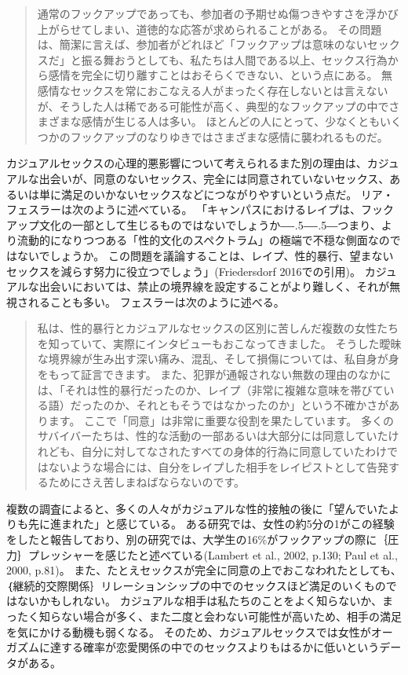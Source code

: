 \documentclass[paper=a4,book,openany]{jlreq}
\def\DDASH{―\kern-.5\zw―\kern-.5\zw―} %
\begin{document}
\begin{quote}
 通常のフックアップであっても、参加者の予期せぬ傷つきやすさを浮かび上がらせてしまい、道徳的な応答が求められることがある。
その問題は、簡潔に言えば、参加者がどれほど「フックアップは意味のないセックスだ」と振る舞おうとしても、私たちは人間である以上、セックス行為から感情を完全に切り離すことはおそらくできない、という点にある。
無感情なセックスを常におこなえる人がまったく存在しないとは言えないが、そうした人は稀である可能性が高く、典型的なフックアップの中でさまざまな感情が生じる人は多い。
ほとんどの人にとって、少なくともいくつかのフックアップのなりゆきではさまざまな感情に襲われるものだ。
\citep[Chapter 7]{rocha19}
\end{quote}

カジュアルセックスの心理的悪影響について考えられるまた別の理由は、カジュアルな出会いが、同意のないセックス、完全には同意されていないセックス、あるいは単に満足のいかないセックスなどにつながりやすいという点だ。
リア・フェスラーは次のように述べている。
「キャンパスにおけるレイプは、フックアップ文化の一部として生じるものではないでしょうか{\DDASH}つまり、より流動的になりつつある「性的文化のスペクトラム」の極端で不穏な側面なのではないでしょうか。
この問題を議論することは、レイプ、性的暴行、望まないセックスを減らす努力に役立つでしょう」(Friedersdorf 2016での引用)\nocite{friedersdorf16:_how_does_hook}。
カジュアルな出会いにおいては、禁止の境界線を設定することがより難しく、それが無視されることも多い。
フェスラーは次のように述べる。

\begin{quote}
 私は、性的暴行とカジュアルなセックスの区別に苦しんだ複数の女性たちを知っていて、実際にインタビューもおこなってきました。
そうした曖昧な境界線が生み出す深い痛み、混乱、そして損傷については、私自身が身をもって証言できます。
また、犯罪が通報されない無数の理由のなかには、「それは性的暴行だったのか、レイプ（非常に複雑な意味を帯びている語）だったのか、それともそうではなかったのか」という不確かさがあります。
ここで「同意」は非常に重要な役割を果たしています。
多くのサバイバーたちは、性的な活動の一部あるいは大部分には同意していたけれども、自分に対してなされたすべての身体的行為に同意していたわけではないような場合には、自分をレイプした相手をレイピストとして告発するためにさえ苦しまねばならないのです。
\citep{friedersdorf16:_how_does_hook}
\end{quote}

複数の調査によると、多くの人々がカジュアルな性的接触の後に「望んでいたよりも先に進まれた」と感じている。
ある研究では、女性の約5分の1がこの経験をしたと報告しており、別の研究では、大学生の16\%がフックアップの際に｛圧力｝{プレッシャー}を感じたと述べている(Lambert et al., 2002, p.130; Paul et al., 2000, p.81)。
\nocite{lambert02:_plur_ignor_hook_up}\nocite{paul00:_hook}
また、たとえセックスが完全に同意の上でおこなわれたとしても、｛継続的交際関係｝{リレーションシップ}の中でのセックスほど満足のいくものではないかもしれない。
カジュアルな相手は私たちのことをよく知らないか、まったく知らない場合が多く、また二度と会わない可能性が高いため、相手の満足を気にかける動機も弱くなる。
そのため、カジュアルセックスでは女性がオーガズムに達する確率が恋愛関係の中でのセックスよりもはるかに低いというデータがある\citep{armstrong10:_orgas_coll_hook_relat}。
\end{document}
